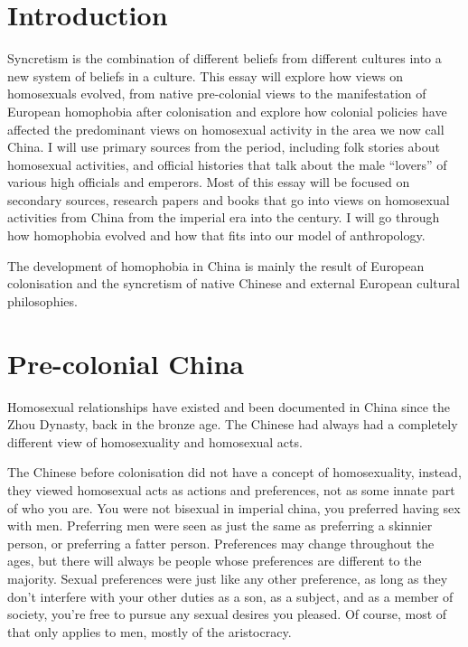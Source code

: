 \section{Introduction}

Syncretism is the combination of different beliefs from different cultures into a new system of beliefs in a culture. This essay will explore how views on homosexuals evolved, from native pre-colonial views to the manifestation of European homophobia after colonisation and explore how colonial policies have affected the predominant views on homosexual activity in the area we now call China. I will use primary sources from the period, including folk stories about homosexual activities, and official histories that talk about the male “lovers” of various high officials and emperors. Most of this essay will be focused on secondary sources, research papers and books that go into views on homosexual activities from China from the imperial era into the  century. I will go through how homophobia evolved and how that fits into our model of anthropology.

The development of homophobia in China is mainly the result of European colonisation and the syncretism of native Chinese and external European cultural philosophies.

\newpage
\section{Pre-colonial China}

Homosexual relationships have existed and been documented in China since the Zhou Dynasty, back in the bronze age\autocite{hinsch1990passions}. The Chinese had always had a completely different view of homosexuality and homosexual acts.

The Chinese before colonisation did not have a concept of homosexuality, instead, they viewed homosexual acts as actions and preferences, not as some innate part of who you are. You were not bisexual in imperial china, you preferred having sex with men\Autocite{1997後殖民同志}. Preferring men were seen as just the same as preferring a skinnier person, or preferring a fatter person. Preferences may change throughout the ages, but there will always be people whose preferences are different to the majority. Sexual preferences were just like any other preference, as long as they don't interfere with your other duties as a son, as a subject, and as a member of society, you're free to pursue any sexual desires you pleased. Of course, most of that only applies to men, mostly of the aristocracy\autocite{hinsch1990passions}.

